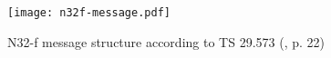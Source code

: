 \begin{figure}[h!]
    \centering
    \texttt{[image: n32f-message.pdf]}
    \caption{N32-f message structure according to TS 29.573 (\cite{3gpp.29.573}, p. 22)}
    \label{fig:n32f-message}
\end{figure}
